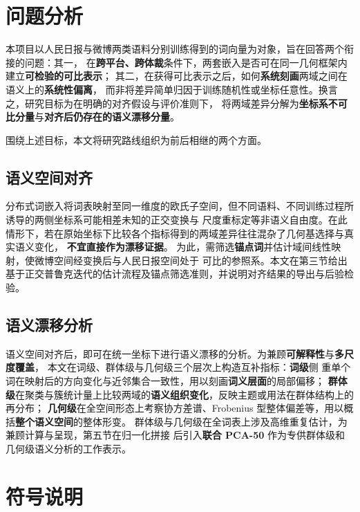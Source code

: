 \documentclass[withoutpreface]{cumcmthesis}
\begin{document}
\tableofcontents
\newpage

\section{问题分析}

本项目以人民日报与微博两类语料分别训练得到的词向量为对象，旨在回答两个衔接的问题：其一，
在\textbf{跨平台、跨体裁}条件下，两套嵌入是否可在同一几何框架内建立\textbf{可检验的可比表示}；
其二，在获得可比表示之后，如何\textbf{系统刻画}两域之间在语义上的\textbf{系统性偏离}，
而非将差异简单归因于训练随机性或坐标任意性。换言之，研究目标为在明确的对齐假设与评价准则下，
将两域差异分解为\textbf{坐标系不可比分量}与\textbf{对齐后仍存在的语义漂移分量}。

围绕上述目标，本文将研究路线组织为前后相继的两个方面。

\subsection{语义空间对齐}
分布式词嵌入将词表映射至同一维度的欧氏子空间，但不同语料、不同训练过程所诱导的两侧坐标系可能相差未知的正交变换与
尺度重标定等非语义自由度。在此情形下，若在原始坐标下比较各个指标得到的两域差异往往混杂了几何基选择与真实语义变化，
\textbf{不宜直接作为漂移证据}。
为此，需筛选\textbf{锚点词}并估计域间线性映射，使微博空间经变换后与人民日报空间处于
可比的参照系。本文在第三节给出基于正交普鲁克迭代的估计流程及锚点筛选准则，并说明对齐结果的导出与后验检验。

\subsection{语义漂移分析}
语义空间对齐后，即可在统一坐标下进行语义漂移的分析。为兼顾\textbf{可解释性}与\textbf{多尺度覆盖}，
本文在词级、群体级与几何级三个层次上构造互补指标：\textbf{词级}侧
重单个词在映射后的方向变化与近邻集合一致性，用以刻画\textbf{词义层面}的局部偏移；
\textbf{群体级}在聚类与簇统计量上比较两域的\textbf{语义组织变化}，反映主题或用法在群体结构上的再分布；
\textbf{几何级}在全空间形态上考察协方差谱、Frobenius 型整体偏差等，用以概括\textbf{整个语义空间}的整体形变。
群体级与几何级在全词表上涉及高维重复估计，为兼顾计算与呈现，第五节在归一化拼接
后引入\textbf{联合 PCA-50} 作为专供群体级和几何级语义分析的工作表示。

\section{符号说明}
\end{document}
